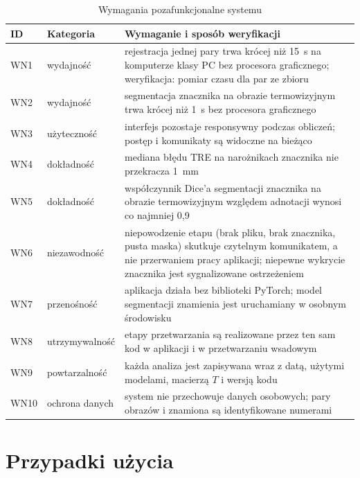\begin{table}[htbp]
  \centering
  \caption{Wymagania pozafunkcjonalne systemu}
  \label{tab:wnf}
  \small
  \begin{tabularx}{\textwidth}{l l X}
    \toprule
    ID & Kategoria & Wymaganie i sposób weryfikacji \\
    \midrule
    WN1 & wydajność & rejestracja jednej pary trwa krócej niż 15~s na komputerze klasy PC bez procesora graficznego; weryfikacja: pomiar czasu dla par ze zbioru \\ %
    WN2 & wydajność & segmentacja znacznika na obrazie termowizyjnym trwa krócej niż 1~s bez procesora graficznego \\ %
    WN3 & użyteczność & interfejs pozostaje responsywny podczas obliczeń; postęp i komunikaty są widoczne na bieżąco \\
    WN4 & dokładność & mediana błędu TRE na narożnikach znacznika nie przekracza 1~mm \\ %
    WN5 & dokładność & współczynnik Dice'a segmentacji znacznika na obrazie termowizyjnym względem adnotacji wynosi co najmniej 0,9 \\
    WN6 & niezawodność & niepowodzenie etapu (brak pliku, brak znacznika, pusta maska) skutkuje czytelnym komunikatem, a nie przerwaniem pracy aplikacji; niepewne wykrycie znacznika jest sygnalizowane ostrzeżeniem \\
    WN7 & przenośność & aplikacja działa bez biblioteki PyTorch; model segmentacji znamienia jest uruchamiany w osobnym środowisku \\
    WN8 & utrzymywalność & etapy przetwarzania są realizowane przez ten sam kod w aplikacji i w przetwarzaniu wsadowym \\
    WN9 & powtarzalność & każda analiza jest zapisywana wraz z datą, użytymi modelami, macierzą $T$ i wersją kodu \\
    WN10 & ochrona danych & system nie przechowuje danych osobowych; pary obrazów i znamiona są identyfikowane numerami \\
    \bottomrule
  \end{tabularx}
\end{table}

\section{Przypadki użycia}
\label{sec:przypadki-uzycia}

